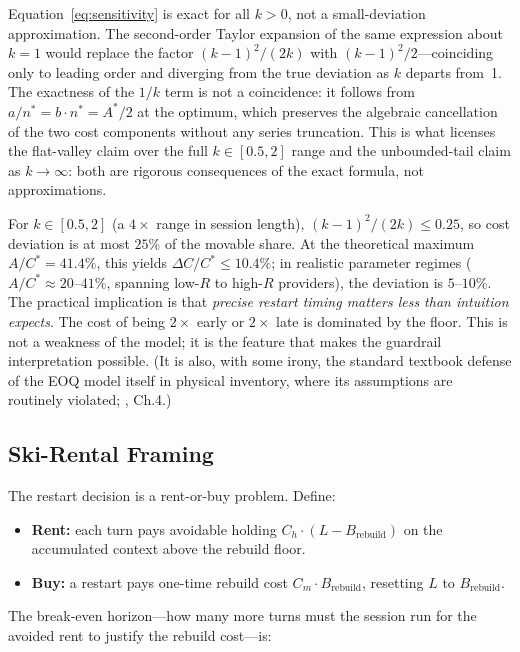 \documentclass[11pt]{article}
\theoremstyle{definition}
\theoremstyle{remark}
\begin{document}
Equation~\ref{eq:sensitivity} is exact for all $k > 0$, not a small-deviation approximation. The second-order Taylor expansion of the same expression about $k=1$ would replace the factor $(k-1)^2/(2k)$ with $(k-1)^2/2$---coinciding only to leading order and diverging from the true deviation as $k$ departs from~1. The exactness of the $1/k$ term is not a coincidence: it follows from $a/n^* = b\cdot n^* = A^*/2$ at the optimum, which preserves the algebraic cancellation of the two cost components without any series truncation. This is what licenses the flat-valley claim over the full $k\in[0.5,2]$ range and the unbounded-tail claim as $k\to\infty$: both are rigorous consequences of the exact formula, not approximations.

For $k \in [0.5, 2]$ (a $4\times$ range in session length), $(k-1)^2/(2k) \le 0.25$, so cost deviation is at most $25\%$ of the movable share. At the theoretical maximum $A/C^* = 41.4\%$, this yields $\Delta C/C^* \le 10.4\%$; in realistic parameter regimes ($A/C^* \approx 20$--$41\%$, spanning low-$R$ to high-$R$ providers), the deviation is $5$--$10\%$. The practical implication is that \emph{precise restart timing matters less than intuition expects}. The cost of being $2\times$ early or $2\times$ late is dominated by the floor. This is not a weakness of the model; it is the feature that makes the guardrail interpretation possible. (It is also, with some irony, the standard textbook defense of the EOQ model itself in physical inventory, where its assumptions are routinely violated; \cite{silver2017}, Ch.4.)

\subsection{Ski-Rental Framing}
\label{sec:skirental}

The restart decision is a rent-or-buy problem. Define:
\begin{itemize}[leftmargin=*,itemsep=0pt,topsep=0pt]
\item \textbf{Rent:} each turn pays avoidable holding $C_h \cdot (L - B_{\text{rebuild}})$ on the accumulated context above the rebuild floor.
\item \textbf{Buy:} a restart pays one-time rebuild cost $C_m \cdot B_{\text{rebuild}}$, resetting $L$ to $B_{\text{rebuild}}$.
\end{itemize}

The break-even horizon---how many more turns must the session run for the avoided rent to justify the rebuild cost---is:
\end{document}
